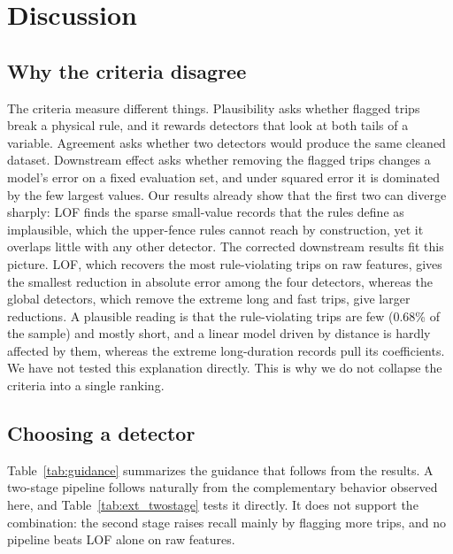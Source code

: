\documentclass{ieeeaccess}
\begin{document}
\section{Discussion}
\label{sec:discussion}

\subsection{Why the criteria disagree}
The criteria measure different things. Plausibility asks whether flagged trips break a physical rule, and it rewards detectors that look at both tails of a variable. Agreement asks whether two detectors would produce the same cleaned dataset. Downstream effect asks whether removing the flagged trips changes a model's error on a fixed evaluation set, and under squared error it is dominated by the few largest values. Our results already show that the first two can diverge sharply: LOF finds the sparse small-value records that the rules define as implausible, which the upper-fence rules cannot reach by construction, yet it overlaps little with any other detector. The corrected downstream results fit this picture. LOF, which recovers the most rule-violating trips on raw features, gives the smallest reduction in absolute error among the four detectors, whereas the global detectors, which remove the extreme long and fast trips, give larger reductions. A plausible reading is that the rule-violating trips are few (0.68\% of the sample) and mostly short, and a linear model driven by distance is hardly affected by them, whereas the extreme long-duration records pull its coefficients. We have not tested this explanation directly. This is why we do not collapse the criteria into a single ranking.

\subsection{Choosing a detector}
Table~\ref{tab:guidance} summarizes the guidance that follows from the results. A two-stage pipeline follows naturally from the complementary behavior observed here, and Table~\ref{tab:ext_twostage} tests it directly. It does not support the combination: the second stage raises recall mainly by flagging more trips, and no pipeline beats LOF alone on raw features.
\end{document}
